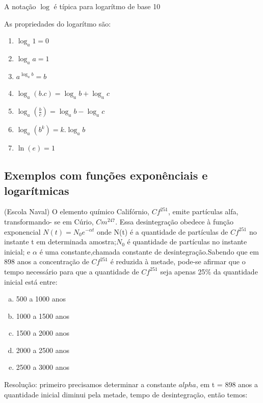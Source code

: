 \begin{multicols*}{2}
    A notação $\log$ é típica para logarítmo de base 10

    As propriedades do logarítmo são:

    \begin{enumerate}
        \item $\log_a 1 = 0$
        \item $\log_a a = 1$
        \item $a^{\log_a b} = b$
        \item $\log_a (b.c) = \log_a b + \log_a c$
        \item $\log_a \left( \frac{b}{c} \right) = \log_a b - \log_a c$
        \item $\log_a (b^k) = k.\log_a b$
        \item $\ln(e) = 1$

    \end{enumerate}


    \subsection*{Exemplos com funções exponênciais e logarítmicas}

    \setcounter{numexercicio}{0}
    \execnum (Escola Naval) O elemento químico Califórnio, $Cf^{251}$, emite partículas alfa, transformando-			se em Cúrio, $Cm^{247}$. Essa desintegração obedece à função exponencial $N(t) = N_0 e^{ - 				\alpha t}$ onde N(t) é a quantidade de partículas de $Cf^{251}$ no instante t em determinada 			amostra;$N_0$ é quantidade de partículas no instante inicial; e $\alpha$ é uma 							constante,chamada constante  de desintegração.Sabendo que em 898 anos a concentração de 				$Cf^{251}$ é reduzida à metade, pode-se afirmar que o tempo necessário para que a
    quantidade de $Cf^{251}$ seja apenas 25\% da quantidade inicial está entre:

    \begin{enumerate}[(a)]
        \item 500 a 1000 anos
        \item 1000 a 1500 anos
        \item 1500 a 2000 anos
        \item 2000 a 2500 anos
        \item 2500 a 3000 anos
    \end{enumerate}

    Resolução: primeiro precisamos determinar a constante $alpha$, em t = 898 anos a quantidade 			inicial diminui pela metade, tempo de desintegração, então temos:


\end{multicols*}
